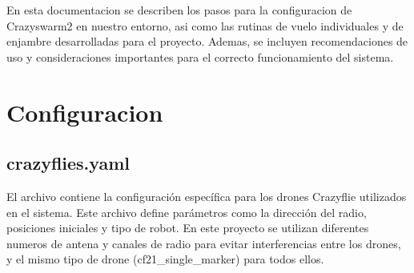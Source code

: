 \documentclass[a4paper,11pt,spanish]{sphinxmanual}
\begin{document}
\sphinxAtStartPar
En esta documentacion se describen los pasos para la configuracion de Crazyswarm2 en nuestro entorno, asi como las rutinas de vuelo individuales y de enjambre desarrolladas para el proyecto. Ademas, se incluyen recomendaciones de uso y consideraciones importantes para el correcto funcionamiento del sistema.

\sphinxstepscope


\chapter{Configuracion}
\label{\detokenize{configuracion:configuracion}}\label{\detokenize{configuracion::doc}}

\section{crazyflies.yaml}
\label{\detokenize{configuracion:crazyflies-yaml}}
\sphinxAtStartPar
El archivo  contiene la configuración específica para los drones Crazyflie utilizados en el sistema. Este archivo define parámetros como la dirección del radio, posiciones iniciales y tipo de robot. En este proyecto se utilizan diferentes numeros de antena y canales de radio para evitar interferencias entre los drones, y el mismo tipo de drone (cf21\_single\_marker) para todos ellos.

\begin{sphinxVerbatim}[commandchars=\\\{\}]
\PYG{p+pIndicator}{[}\PYG{p+pIndicator}{]}
\end{sphinxVerbatim}
\end{document}
